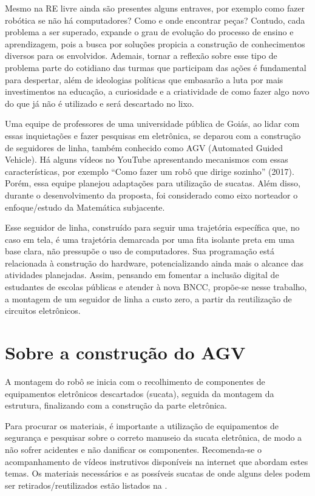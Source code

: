 \documentclass{textolivre}
\begin{document}
Mesmo na RE livre ainda são presentes alguns entraves, por exemplo como fazer
robótica se não há computadores? Como e onde encontrar peças? Contudo, cada
problema a ser superado, expande o grau de evolução do processo de ensino e
aprendizagem, pois a busca por soluções propicia a construção de conhecimentos
diversos para os envolvidos. Ademais, tornar a reflexão sobre esse tipo de
problema parte do cotidiano das turmas que participam das ações é fundamental
para despertar, além de ideologias políticas que embasarão a luta por mais
investimentos na educação, a curiosidade e a criatividade de como fazer algo
novo do que já não é utilizado e será descartado no lixo.

Uma equipe de professores de uma universidade pública de Goiás, ao lidar com
essas inquietações e fazer pesquisas em eletrônica, se deparou com a construção
de seguidores de linha, também conhecido como AGV (Automated Guided Vehicle).
Há alguns vídeos no YouTube apresentando mecanismos com essas características,
por exemplo “Como fazer um robô que dirige sozinho” (2017). Porém, essa equipe
planejou adaptações para utilização de sucatas. Além disso, durante o
desenvolvimento da proposta, foi considerado como eixo norteador o
enfoque/estudo da Matemática subjacente.

Esse seguidor de linha, construído para seguir uma trajetória específica que,
no caso em tela, é uma trajetória demarcada por uma fita isolante preta em uma
base clara, não pressupõe o uso de computadores. Sua programação está
relacionada à construção do hardware, potencializando ainda mais o alcance das
atividades planejadas. Assim, pensando em fomentar a inclusão digital de
estudantes de escolas públicas e atender à nova BNCC, propõe-se nesse trabalho,
a montagem de um seguidor de linha a custo zero, a partir da reutilização de
circuitos eletrônicos.


\section{Sobre a construção do AGV}\label{sec-contrucao}
A montagem do robô se inicia com o recolhimento de componentes de equipamentos
eletrônicos descartados (sucata), seguida da montagem da estrutura, finalizando
com a construção da parte eletrônica.

Para procurar os materiais, é importante a utilização de equipamentos de
segurança e pesquisar sobre o correto manuseio da sucata eletrônica, de modo a
não sofrer acidentes e não danificar os componentes. Recomenda-se o
acompanhamento de vídeos instrutivos disponíveis na internet que abordam estes
temas. Os materiais necessários e as possíveis sucatas de onde alguns deles
podem ser retirados/reutilizados estão listados na .
\end{document}

